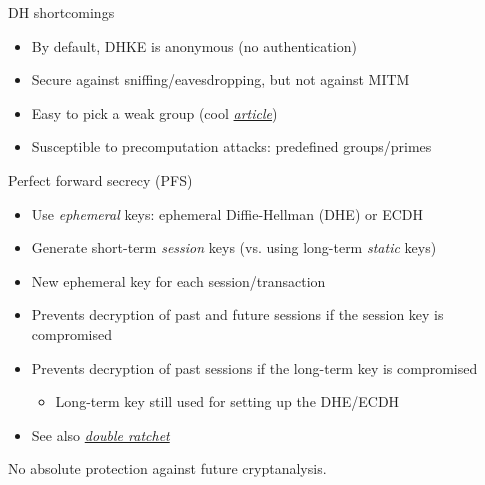\begin{frame}{DH shortcomings}
  \begin{itemize}[<+(1)->]
    \item By default, DHKE is anonymous (no authentication)
    \item Secure against sniffing/eavesdropping, but not against MITM
    \item Easy to pick a weak group (cool \href{https://weakdh.org/imperfect-forward-secrecy-ccs15.pdf}{\textit{article}})
    \item Susceptible to precomputation attacks: predefined groups/primes
  \end{itemize}
\end{frame}

\begin{frame}{Perfect forward secrecy (PFS)}
  \begin{itemize}[<+->]
    \item Use \emph{ephemeral} keys: ephemeral Diffie-Hellman (DHE) or ECDH
    \item Generate short-term \emph{session} keys (vs. using long-term \emph{static} keys)
    \item New ephemeral key for each session/transaction
    \item Prevents decryption of past and future sessions if the session key is compromised
    \item Prevents decryption of past sessions if the long-term key is compromised
    \begin{itemize}
      \item Long-term key still used for setting up the DHE/ECDH
    \end{itemize}
    \item See also \emph{\href{https://en.wikipedia.org/wiki/Double_Ratchet_Algorithm}{double ratchet}}
  \end{itemize}

  \pause
  No absolute protection against future cryptanalysis.
\end{frame}

